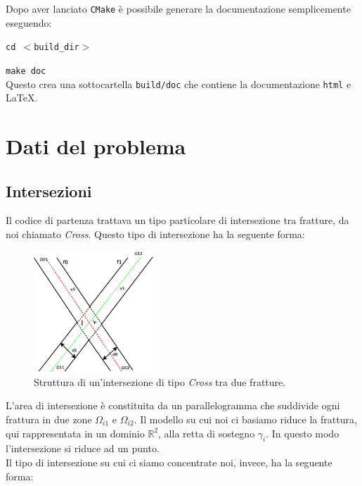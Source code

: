 \noindent Dopo aver lanciato \texttt{CMake} è possibile generare la documentazione semplicemente eseguendo: \\
\par \texttt{cd $<$build\_dir$>$} 
\par \texttt{make doc} \\

\noindent Questo crea una sottocartella \texttt{build/doc} che contiene la documentazione \texttt{html} e \LaTeX{}.

\newpage

\section{Dati del problema}

\subsection{Intersezioni}
Il codice di partenza trattava un tipo particolare di intersezione tra fratture, da noi chiamato \textit{Cross}. Questo tipo di intersezione ha la seguente forma:

\begin{figure}[htbp]
\begin{center}
\includegraphics[width=0.4\textwidth]{img/cap2/cross.eps}
\caption{Struttura di un'intersezione di tipo \textit{Cross} tra due fratture.}\label{Cross}
\end{center}
\end{figure}

\noindent L'area di intersezione è constituita da un parallelogramma che suddivide ogni frattura in due zone $\Omega_{i1}$ e $\Omega_{i2}$. Il modello su cui noi ci basiamo riduce la frattura, qui rappresentata in un dominio $\mathbb{R}^{2}$, alla retta di sostegno $\gamma_i$. In questo modo l'intersezione si riduce ad un punto.\\
Il tipo di intersezione su cui ci siamo concentrate noi, invece, ha la seguente forma:

